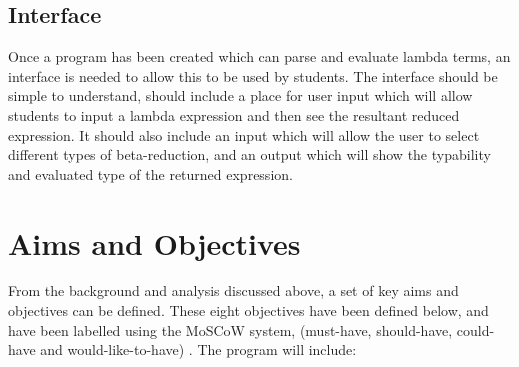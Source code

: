 \documentclass[a4paper,11pt]{report}
\begin{document}
\section{Interface}

Once a program has been created which can parse and evaluate lambda terms, an interface is needed to allow this to be used by students. The interface should be simple to understand, should include a place for user input which will allow students to input a lambda expression and then see the resultant reduced expression. It should also include an input which will allow the user to select different types of beta-reduction, and an output which will show the typability and evaluated type of the returned expression.

\chapter{Aims and Objectives}

From the background and analysis discussed above, a set of key aims and objectives can be defined. These eight objectives have been defined below, and have been labelled using the MoSCoW system, (must-have, should-have, could-have and would-like-to-have) \cite{Agile2014}.
The program will include:
\end{document}

